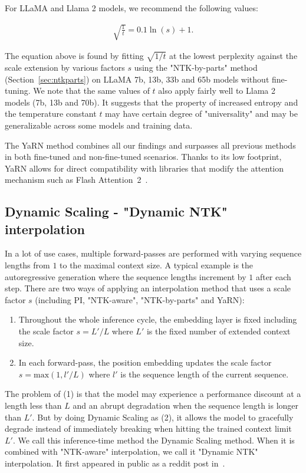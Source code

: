 For LLaMA and Llama 2 models, we recommend the following values:

\begin{align}\label{eq:yarn_t}
    \sqrt{\frac{1}{t}} = 0.1 \ln({s}) + 1.
\end{align}

The equation above is found by fitting $\sqrt{1/t}$ at the lowest perplexity against the scale extension by various factors $s$ using the "NTK-by-parts" method (Section~\ref{sec:ntkparts}) on LLaMA 7b, 13b, 33b and 65b models without fine-tuning. We note that the same values of $t$ also apply fairly well to Llama 2 models (7b, 13b and 70b). It suggests that the property of increased entropy and the temperature constant $t$ may have certain degree of "universality" and may be generalizable across some models and training data.

The YaRN method combines all our findings and surpasses all previous methods in both fine-tuned and non-fine-tuned scenarios. Thanks to its low footprint, YaRN allows for direct compatibility with libraries that modify the attention mechanism such as Flash Attention~2~\citep{dao2023flashattention2}.

\subsection{Dynamic Scaling - "Dynamic NTK" interpolation}\label{sec:dynamic}

In a lot of use cases, multiple forward-passes are performed with varying sequence lengths from $1$ to the maximal context size. A typical example is the autoregressive generation where the sequence lengths increment by $1$ after each step. There are two ways of applying an interpolation method that uses a scale factor $s$ (including PI, "NTK-aware", "NTK-by-parts" and YaRN):

\begin{enumerate}
    \item Throughout the whole inference cycle, the embedding layer is fixed including the scale factor $s=L'/L$ where $L'$ is the fixed number of extended context size.
    \item In each forward-pass, the position embedding updates the scale factor $s=\text{max}(1, l'/L)$ where $l'$ is the sequence length of the current sequence.
\end{enumerate}

The problem of (1) is that the model may experience a performance discount at a length less than $L$ and an abrupt degradation when the sequence length is longer than $L'$. But by doing Dynamic Scaling as (2), it allows the model to gracefully degrade instead of immediately breaking when hitting the trained context limit $L'$. We call this inference-time method the Dynamic Scaling method. When it is combined with "NTK-aware" interpolation, we call it "Dynamic NTK" interpolation. It first appeared in public as a reddit post in~\citep{emozillareddit}.

